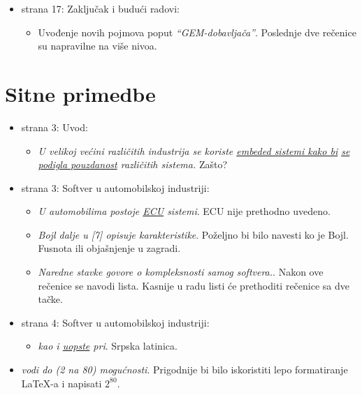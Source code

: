 \documentclass[a4paper]{report}
\begin{document}
\begin{itemize}
\item strana 17: Zaključak i budući radovi:
  \begin{itemize}
  \item Uvođenje novih pojmova poput {\em{``GEM-dobavljača''}}. Poslednje dve rečenice su napravilne na više nivoa.
  \end{itemize}
\end{itemize}




\section{Sitne primedbe}


\begin{itemize}
\item strana 3: Uvod:
  \begin{itemize}
  \item {\em{U velikoj većini različitih industrija se koriste {\underline{embeded sistemi kako bi} {\underline{ se podigla pouzdanost}}} različitih sistema.}}
    Zašto?
  \end{itemize}
\end{itemize}
\begin{itemize}
\item strana 3: Softver u automobilskoj industriji:
  \begin{itemize}
  \item {\em{U automobilima postoje {\underline{ECU}}} sistemi}. ECU nije prethodno uvedeno.
  \item {\em{Bojl dalje u [7] opisuje karakteristike}}. Poželjno bi bilo navesti ko je Bojl. Fusnota ili objašnjenje u zagradi.
  \item {\em{Naredne stavke govore o kompleksnosti samog softvera.}}. Nakon ove rečenice se navodi lista. Kasnije u radu listi će prethoditi rečenice sa dve tačke.
  \end{itemize}
\end{itemize}
\begin{itemize}
\item strana 4: Softver u automobilskoj industriji:
  \begin{itemize}
  \item {\em{kao i {\underline{uopste}} pri}}. Srpska latinica.
  \end{itemize}
\item {\em{ vodi do (2 na 80) mogućnosti}}. Prigodnije bi bilo iskoristiti lepo formatiranje \LaTeX-a i napisati $2^{80}$.
\end{itemize}
\end{document}
